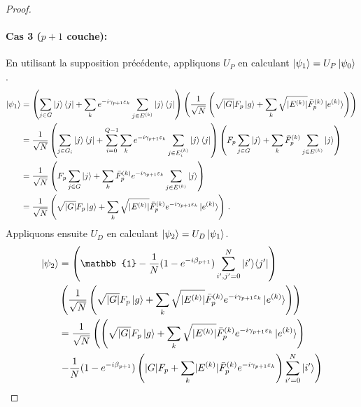 \begin{proof}
\paragraph{Cas 3 ($p+1$ couche):} En utilisant la supposition précédente, appliquons $U_{P}$ en calculant $\ket{\psi_{1}} = U_{P} \ket{\psi_{0}}$.
\begin{equation}
\begin{aligned}
\ket{\psi_{1}} & = \left(\sum_{j \in G} \ket{j}\bra{j} + \sum_{k} e^{-i \gamma_{p+1} \varepsilon_{k}} \sum_{j \in E^{(k)}} \ket{j}\bra{j} \right) \left( \frac{1}{\sqrt{ N }} \left( \sqrt{ \lvert G \rvert } F_{p} \ket{g} + \sum_{k} \sqrt{ \lvert E^{(k)} \rvert } \bar{F}^{(k)}_{p} \ket{e^{(k)}} \right) \right) \\
& = \frac{1}{\sqrt{ N }} \left( \sum_{j \in G_{i}} \ket{j}\bra{j} + \sum_{i=0}^{Q-1} \sum_{k} e^{-i \gamma_{p+1} \varepsilon_{k}} \sum_{j \in E^{(k)}_{i}} \ket{j}\bra{j} \right) \left( F_{p} \sum_{j \in G} \ket{j} + \sum_{k} \bar{F}^{(k)}_{p} \sum_{j \in E^{(k)}}\ket{j} \right) \\
& = \frac{1}{\sqrt{ N }} \left( F_{p} \sum_{j \in G}\ket{j}  + \sum_{k} \bar{F}^{(k)}_{p} e^{-i \gamma_{p+1} \varepsilon_{k}} \sum_{j \in E^{(k)}} \ket{j} \right) \\
& = \frac{1}{\sqrt{ N }} \left( \sqrt{ \lvert G \rvert  } F_{p} \ket{g} + \sum_{k} \sqrt{ \lvert E^{(k)} \rvert  }\bar{F}^{(k)}_{p} e^{-i \gamma_{p+1} \varepsilon_{k}} \ket{e^{(k)}} \right) \,. \\
\end{aligned}
\end{equation}
Appliquons ensuite $U_{D}$ en calculant $\ket{\psi_{2}}=U_{D}\ket{\psi_{1}}$.
\begin{equation}
\begin{aligned}
\ket{\psi_{2}} &= \left( \mathbb{1} - \frac{1}{N} (1 - e^{-i\beta_{p+1}}) \sum_{i',j'=0}^{N} \ket{i'}\!\bra{j'} \right) \\
&\left( \frac{1}{\sqrt{ N }} \left( \sqrt{ \lvert G \rvert  } F_{p} \ket{g} + \sum_{k} \sqrt{ \lvert E^{(k)} \rvert  }\bar{F}^{(k)}_{p} e^{-i \gamma_{p+1} \varepsilon_{k}} \ket{e^{(k)}} \right) \right) \\
&= \frac{1}{\sqrt{ N }} \left( \left( \sqrt{ \lvert G \rvert  } F_{p} \ket{g} + \sum_{k} \sqrt{ \lvert E^{(k)} \rvert  }\bar{F}^{(k)}_{p} e^{-i \gamma_{p+1} \varepsilon_{k}} \ket{e^{(k)}} \right) \right. \\
& \left. - \frac{1}{N} (1 - e^{-i\beta_{p+1}}) \left(  \lvert G \rvert F_{p} + \sum_{k} \lvert E^{(k)} \rvert \bar{F}^{(k)}_{p} e^{-i \gamma_{p+1} \varepsilon_{k}}\right) \sum_{i'=0}^{N} \ket{i'} \right) \\

\end{aligned}
\end{equation}
\end{proof}
